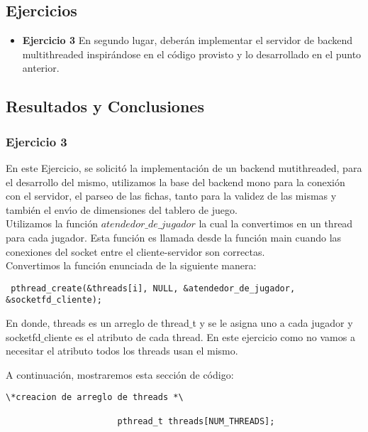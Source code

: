 
\subsection{Ejercicios}
\begin{itemize}
 \item 
\textbf{Ejercicio 3}
En segundo lugar, deberán implementar el servidor de backend multithreaded inspirándose en el código provisto y lo desarrollado en el punto anterior.
\end{itemize}

\subsection{Resultados y Conclusiones}


\subsubsection[Resolución Ejercicio 3]{Ejercicio 3}

\indent En este Ejercicio, se solicit\'{o} la implementación de un backend mutithreaded, para el desarrollo del mismo,
utilizamos la base del backend mono para la conexi\'{o}n con el servidor, el parseo de las fichas, tanto para la validez de las mismas
y tambi\'{e}n el env\'{\i}o de dimensiones del tablero de juego.\\

Utilizamos la función $atendedor\_de\_jugador$ la cual la convertimos en un thread para cada jugador. Esta función es llamada desde
la función main cuando las conexiones del socket entre el cliente-servidor son correctas. \\
Convertimos la función enunciada de la siguiente manera:\\
\begin{verbatim}
 pthread_create(&threads[i], NULL, &atendedor_de_jugador, &socketfd_cliente);
\end{verbatim}

En donde, threads es un arreglo de thread$\_$t y se le asigna uno a cada jugador y socketfd$\_$cliente es el atributo 
de cada thread. En este ejercicio como no vamos a necesitar el atributo todos los threads usan el mismo.

A continuación, mostraremos esta sección de código:\\
\begin{verbatim}
\*creacion de arreglo de threads *\

                      pthread_t threads[NUM_THREADS];
                      
\end{verbatim}


